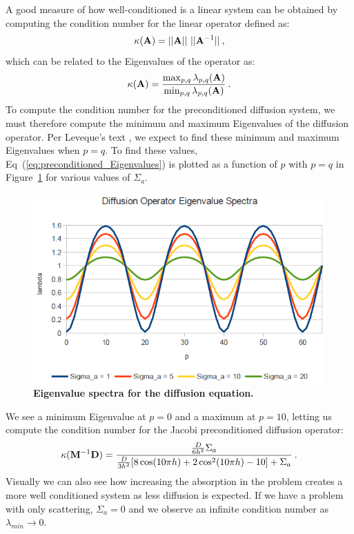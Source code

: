 \documentclass{mc2013}
\begin{document}
A good measure of how well-conditioned is a linear system can be
obtained by computing the condition number for the linear operator
defined as:
\begin{equation}
  \kappa(\ve{A}) = ||\ve{A}||\ ||\ve{A}^{-1}||\:,
  \label{eq:condition_number}
\end{equation}
which can be related to the Eigenvalues of the operator as:
\begin{equation}
  \kappa(\mathbf{A}) =
  \frac{\max_{p,q}\lambda_{p,q}(\mathbf{A})}{\min_{p,q}\lambda_{p,q}(\mathbf{A})}\:.
  \label{eq:condition_number_2}
\end{equation}
To compute the condition number for the preconditioned diffusion
system, we must therefore compute the minimum and maximum Eigenvalues
of the diffusion operator. Per Leveque's text
\cite{leveque_finite_2007}, we expect to find these minimum and
maximum Eigenvalues when $p=q$. To find these values,
Eq~(\ref{eq:preconditioned_Eigenvalues}) is plotted as a function of
$p$ with $p=q$ in Figure~\ref{fig:diffusion_spectrum} for various
values of $\Sigma_a$.
\vspace{16pt}
\begin{figure}[ht!]
\begin{spacing}{1.0}
  \begin{center}
    \includegraphics[width=5in,clip]{diffusion_spectrum.png}
  \end{center}
  \caption{\textbf{Eigenvalue spectra for the diffusion equation.}}
  \label{fig:diffusion_spectrum}
\end{spacing}
\end{figure}
\vspace{16pt}
We see a minimum Eigenvalue at $p=0$ and a maximum at $p=10$, letting
us compute the condition number for the Jacobi preconditioned
diffusion operator:
\begin{equation}
  \kappa(\mathbf{M}^{-1} \mathbf{D}) =
  \frac{\frac{D}{6h^2}\Sigma_a}{\frac{D}{3h^2}[8 \cos(10 \pi h) + 2
      \cos^2(10 \pi h) - 10] + \Sigma_a}\:.
  \label{eq:diffusion_condition}
\end{equation}
Visually we can also see how increasing the absorption in the problem
creates a more well conditioned system as less diffusion is
expected. If we have a problem with only scattering, $\Sigma_a = 0$
and we observe an infinite condition number as $\lambda_{min}
\rightarrow 0$.
\end{document}
